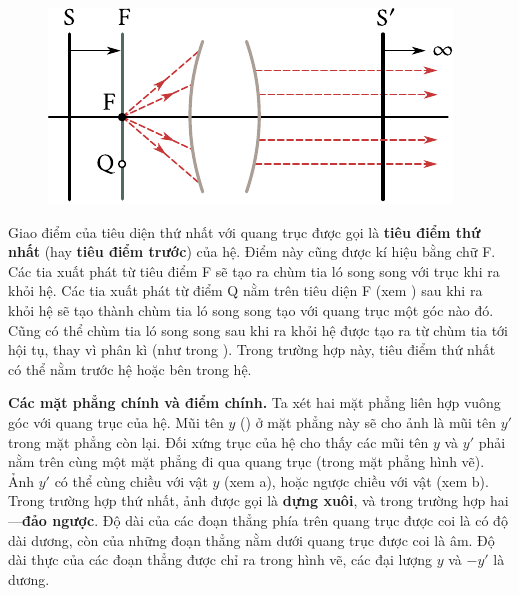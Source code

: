 \begin{figure}[t]
	\begin{center}
		\includegraphics[scale=1]{figures/ch_16/fig_16_14.pdf}
        \caption[]{}
		\label{fig:16_14}
	\end{center}
	\vspace{-0.8cm}
\end{figure}

Giao điểm của tiêu diện thứ nhất với quang trục được gọi là \textbf{tiêu điểm thứ nhất} (hay \textbf{tiêu điểm trước}) của hệ.
Điểm này cũng được kí hiệu bằng chữ F.
Các tia xuất phát từ tiêu điểm F sẽ tạo ra chùm tia ló song song với trục khi ra khỏi hệ. Các tia xuất phát từ điểm Q nằm trên tiêu diện F (xem ) sau khi ra khỏi hệ sẽ tạo thành chùm tia ló song song tạo với quang trục một góc nào đó.
Cũng có thể chùm tia ló song song sau khi ra khỏi hệ được tạo ra từ chùm tia tới hội tụ, thay vì phân kì (như trong ).
Trong trường hợp này, tiêu điểm thứ nhất có thể nằm trước hệ hoặc bên trong hệ.

\textbf{Các mặt phẳng chính và điểm chính.}
Ta xét hai mặt phẳng liên hợp vuông góc với quang trục của hệ.
Mũi tên $y$ () ở mặt phẳng này sẽ cho ảnh là mũi tên $y'$ trong mặt phẳng còn lại.
Đối xứng trục của hệ cho thấy các mũi tên $y$ và $y'$ phải nằm trên cùng một mặt phẳng đi qua quang trục (trong mặt phẳng hình vẽ).
Ảnh $y'$ có thể cùng chiều với vật $y$ (xem a), hoặc ngược chiều với vật (xem b).
Trong trường hợp thứ nhất, ảnh được gọi là \textbf{dựng xuôi}, và trong trường hợp hai---\textbf{đảo ngược}.
Độ dài của các đoạn thẳng phía trên quang trục được coi là có độ dài dương, còn của những đoạn thẳng nằm dưới quang trục được coi là âm.
Độ dài thực của các đoạn thẳng được chỉ ra trong hình vẽ, các đại lượng $y$ và $-y'$ là dương.


